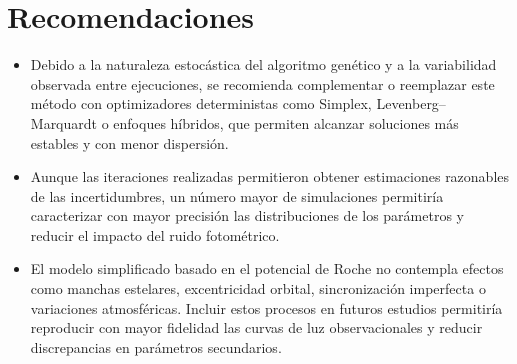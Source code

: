 \chapter{Recomendaciones}

\begin{itemize}

\item Debido a la naturaleza estocástica del algoritmo genético y a la variabilidad observada entre ejecuciones, se recomienda complementar o reemplazar este método con optimizadores deterministas como Simplex, Levenberg–Marquardt o enfoques híbridos, que permiten alcanzar soluciones más estables y con menor dispersión.

\item Aunque las iteraciones realizadas permitieron obtener estimaciones razonables de las incertidumbres, un número mayor de simulaciones permitiría caracterizar con mayor precisión las distribuciones de los parámetros y reducir el impacto del ruido fotométrico.

\item El modelo simplificado basado en el potencial de Roche no contempla efectos como manchas estelares, excentricidad orbital, sincronización imperfecta o variaciones atmosféricas. Incluir estos procesos en futuros estudios permitiría reproducir con mayor fidelidad las curvas de luz observacionales y reducir discrepancias en parámetros secundarios.

\end{itemize}